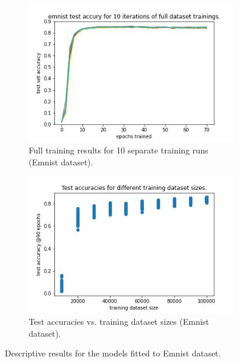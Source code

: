 \documentclass{article} %
\begin{document}
\begin{figure}
    \begin{subfigure}{.5\textwidth}
        \centering
        \includegraphics[width=.8\linewidth]{emnist/full_dataset_acc_vs_epoch.jpg}
        \caption{Full training results for 10 separate training runs (Emnist dataset).}
        \label{fig_full_dataset_epoch_vs_acc}
    \end{subfigure}%
    \begin{subfigure}{.5\textwidth}
        \centering
        \includegraphics[width=.8\linewidth]{emnist/training_datasetsize_vs_test_acc.jpg}
        \caption{Test accuracies vs. training dataset sizes (Emnist dataset).}
        \label{fig_traing_subset_size_vs_test_acc}
    \end{subfigure}

    \caption{Descriptive results for the models fitted to Emnist dataset.}
    \label{fig:desc_plots_emnist}
\end{figure}
\end{document}
